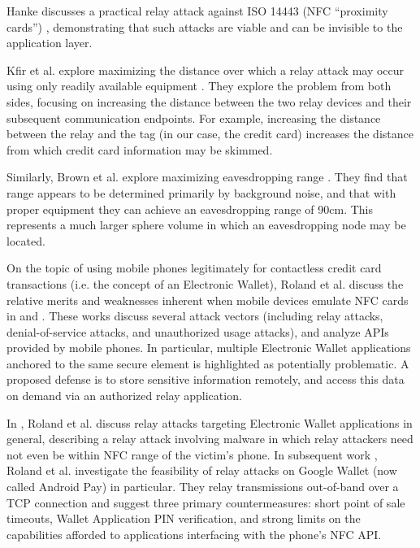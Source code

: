
Hanke discusses a practical relay attack against ISO 14443 (NFC ``proximity cards'') \cite{hancke2005practical},
    demonstrating that such attacks are viable and can be invisible to the application layer.

Kfir et al. explore maximizing the distance over which a relay attack may occur using only readily available equipment \cite{kfir2005picking}.
    They explore the problem from both sides, focusing on increasing the distance between the two relay devices and their subsequent communication endpoints.
For example, increasing the distance between the relay and the tag (in our case, the credit card)
    increases the distance from which credit card information may be skimmed.

Similarly, Brown et al. explore maximizing eavesdropping range \cite{brown2013evaluating}.
They find that range appears to be determined primarily by background noise, and that with proper equipment they can achieve an eavesdropping range of 90cm.
This represents a much larger sphere volume in which an eavesdropping node may be located.


On the topic of using mobile phones legitimately for contactless credit card transactions (i.e. the concept of an Electronic Wallet),
    Roland et al. discuss the relative merits and weaknesses inherent when mobile devices emulate NFC cards in \cite{roland2012software} and \cite{roland2012practical}.
These works discuss several attack vectors (including relay attacks, denial-of-service attacks, and unauthorized usage attacks),
    and analyze APIs provided by mobile phones.
In particular, multiple Electronic Wallet applications anchored to the same secure element is highlighted as potentially problematic.
A proposed defense is to store sensitive information remotely, and access this data on demand via an authorized relay application.

In \cite{roland2012relay}, Roland et al. discuss relay attacks targeting Electronic Wallet applications in general,
    describing a relay attack involving malware in which relay attackers need not even be within NFC range of the victim's phone.
In subsequent work \cite{roland2013applying}, Roland et al. investigate the feasibility of relay attacks on Google Wallet (now called Android Pay) in particular.
They relay transmissions out-of-band over a TCP connection and suggest three primary countermeasures:
    short point of sale timeouts, Wallet Application PIN verification, and strong limits on the capabilities afforded to applications interfacing with the phone's NFC API.

